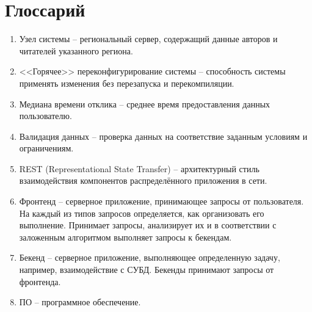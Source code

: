 \section*{Глоссарий}
\begin{enumerate}
	\item Узел системы -- региональный сервер, содержащий данные авторов и читателей указанного региона.
	
	\item <<Горячее>> переконфигурирование системы -- способность системы применять изменения без перезапуска и перекомпиляции.
	
	\item Медиана времени отклика -- среднее время предоставления данных пользователю.
	
	\item Валидация данных  -- проверка данных на соответствие заданным условиям и ограничениям.
	
	\item REST (Representational State Transfer) -- архитектурный стиль взаимодействия компонентов распределённого приложения в сети. 
	
	\item Фронтенд -- серверное приложение, принимающее запросы от пользователя. На каждый из типов запросов определяется, как организовать его выполнение. Принимает запросы, анализирует их и в соответствии с заложенным алгоритмом выполняет запросы к бекендам.
	
	\item Бекенд -- серверное приложение, выполняющее определенную задачу, например, взаимодействие с СУБД. Бекенды принимают запросы от фронтенда.
	
	\item ПО -- программное обеспечение.
\end{enumerate}
